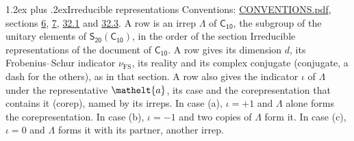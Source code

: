 \documentclass[10pt,a4paper]{article}
\makeatletter
\renewcommand\section{\@startsection{section}{1}{\z@}{-3ex plus -1ex minus -.2ex}%
  {1.2ex plus .2ex}{\normalfont\large\sffamily\bfseries\color{parttitle}}}
\numberwithin{equation}{section}
\newcommand{\eltfont}[1]{{\let\sigma\eltsigma\mathelt{#1}}}
\newcommand{\grp}[1]{\mathsf{#1}}
\newcommand{\elt}[1]{\eltfont{#1}}
\newcommand{\fsind}{\nu_{\mathrm{FS}}}
\makeatother
\begin{document}
\section{Irreducible representations}\label{s:irreps}
Conventions: \href{../../CONVENTIONS.pdf}{CONVENTIONS.pdf}, sections \href{../../../rotation/CONVENTIONS.pdf\#conv.6}{6}, \href{../../../rotation/CONVENTIONS.pdf\#conv.7}{7}, \href{../../CONVENTIONS.pdf\#conv.32.1}{32.1} and \href{../../CONVENTIONS.pdf\#conv.32.3}{32.3}.
\leavevmode\label{n:irrep.Delta}A row is an irrep $\Lambda$ of $\grp{C_{10}}$, the subgroup of the unitary elements of $\grp{S_{20}}(\grp{C_{10}})$, in the order of the section Irreducible representations of the document of \href{../../../rotation/data/pdf/C10.pdf}{$\grp{C_{10}}$}. \label{n:index.dimension}\label{n:index.frobenius}\label{n:head.irrep}\label{n:head.reality}\label{n:head.conjugate}A row gives its dimension $d$, its Frobenius--Schur indicator $\fsind$, its reality and its complex conjugate (conjugate, a dash for the others), as in that section. \label{n:head.case.corep}\label{n:head.corep}A row also gives the indicator $\iota$ of $\Lambda$ under the representative $\elt{a}$, its case and the corepresentation that contains it (corep), named by its irreps. In case (a), $\iota = +1$ and $\Lambda$ alone forms the corepresentation. In case (b), $\iota = -1$ and two copies of $\Lambda$ form it. In case (c), $\iota = 0$ and $\Lambda$ forms it with its partner, another irrep.
\setlength{\emergencystretch}{2em}\par\setlength{\emergencystretch}{0pt}
\end{document}
